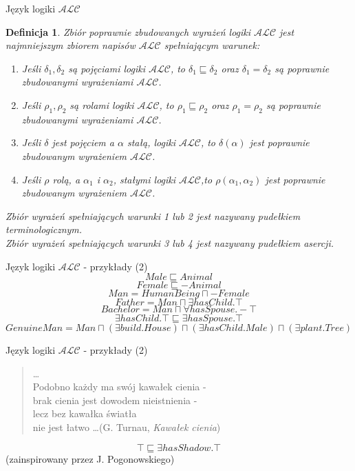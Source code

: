 \documentclass{beamer}
\newtheorem{definicja}{Definicja}
\newcommand {\PZWWRP} {\ensuremath{\mathbb{PZW_{WRP}}}}
\begin{document}
\begin{frame}{Język logiki $\mathcal{ALC}$}
%
\begin{definicja}
\label{PZWAL}
Zbiór poprawnie zbudowanych wyrażeń logiki $\mathcal{ALC}$ jest najmniejszym zbiorem napisów $\mathcal{ALC}$ spełniającym warunek:
%
\begin{enumerate}
\item Jeśli $\delta_{1}, \delta_{2}$ są pojęciami logiki $\mathcal{ALC}$, to $\delta_{1} \sqsubseteq \delta_{2}$ oraz $\delta_{1} = \delta_{2}$ są poprawnie zbudowanymi wyrażeniami $\mathcal{ALC}$.%
\item Jeśli $\rho_{1}, \rho_{2}$ są rolami logiki $\mathcal{ALC}$, to $\rho_{1} \sqsubseteq \rho_{2}$ oraz $\rho_{1} = \rho_{2}$ są poprawnie zbudowanymi wyrażeniami $\mathcal{ALC}$.%
\item Jeśli $\delta$ jest pojęciem a $\alpha$ stałą, logiki $\mathcal{ALC}$, to $\delta(\alpha)$ jest poprawnie zbudowanym wyrażeniem $\mathcal{ALC}$.%
\item Jeśli $\rho$ rolą, a $\alpha_{1}$ i $\alpha_{2}$, stałymi logiki $\mathcal{ALC}$,to $\rho(\alpha_{1}, \alpha_{2})$ jest poprawnie zbudowanym wyrażeniem $\mathcal{ALC}$.%
\end{enumerate}
Zbiór wyrażeń spełniających warunki 1 lub 2 jest nazywany pudełkiem terminologicznym.\\ %
Zbiór wyrażeń spełniających warunki 3 lub 4 jest nazywany pudełkiem asercji.
\end{definicja}
\end{frame}

\begin{frame}{Język logiki $\mathcal{ALC}$ - przykłady (2)}
%
$$Male \sqsubseteq Animal$$
%
$$Female \sqsubseteq - Animal$$
%
$$Man = HumanBeing \sqcap - Female$$ 
%
$$Father = Man \sqcap \exists hasChild . \top$$
%
$$Bachelor = Man \sqcap \forall hasSpouse . - \top$$
%
$$\exists hasChild . \top \sqsubseteq \exists hasSpouse . \top$$
%
$$GenuineMan = Man \sqcap (\exists build . House) \sqcap (\exists hasChild . Male) \sqcap (\exists plant .Tree)$$
\end{frame}


\begin{frame}{Język logiki $\mathcal{ALC}$ - przykłady (2)}
%
\begin{quote}
\dots\\
Podobno każdy ma swój kawałek cienia - \\
brak cienia jest dowodem nieistnienia - \\
lecz bez kawałka światła \\
nie jest łatwo \dots (G. Turnau, \emph{Kawałek cienia})
\end{quote}
%
$$\top \sqsubseteq \exists hasShadow . \top$$
(zainspirowany przez J. Pogonowskiego) \\
\end{frame}
\end{document}
